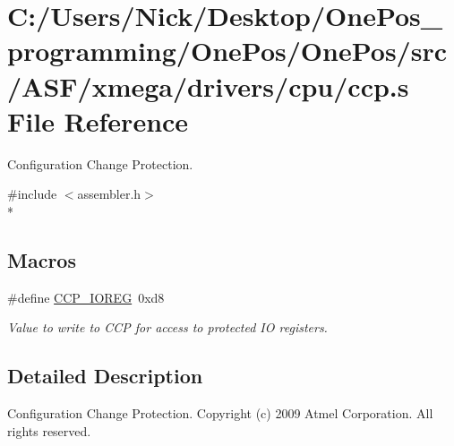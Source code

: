 \hypertarget{ccp_8s}{\section{C\-:/\-Users/\-Nick/\-Desktop/\-One\-Pos\-\_\-programming/\-One\-Pos/\-One\-Pos/src/\-A\-S\-F/xmega/drivers/cpu/ccp.s File Reference}
\label{ccp_8s}
}


Configuration Change Protection.  


{\ttfamily \#include $<$assembler.\-h$>$}\\*
\subsection*{Macros}
\begin{DoxyCompactItemize}
\item 
\hypertarget{ccp_8s_ab7ccb6a35c46ccb7084ed345e5714674}{\#define \hyperlink{ccp_8s_ab7ccb6a35c46ccb7084ed345e5714674}{C\-C\-P\-\_\-\-I\-O\-R\-E\-G}~0xd8}\label{ccp_8s_ab7ccb6a35c46ccb7084ed345e5714674}

\begin{DoxyCompactList}\small\item\em Value to write to C\-C\-P for access to protected I\-O registers. \end{DoxyCompactList}\end{DoxyCompactItemize}


\subsection{Detailed Description}
Configuration Change Protection. Copyright (c) 2009 Atmel Corporation. All rights reserved.